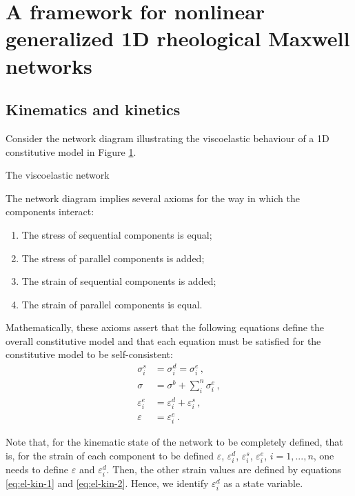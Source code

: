 \documentclass[12pt]{article}
\begin{document}
\section{A framework for nonlinear generalized 1D rheological Maxwell networks}

\subsection{Kinematics and kinetics}
Consider the network diagram illustrating the viscoelastic behaviour of a 1D constitutive model in Figure \ref{fig:network-diagram}.
\begin{figure}[!htb]
	\centering
	\caption{ }
	\label{fig:network-diagram}
\end{figure}
The viscoelastic network 

The network diagram implies several axioms for the way in which the components interact:
\begin{enumerate}
	\item The stress of sequential components is equal;
	\item The stress of parallel components is added;
	\item The strain of sequential components is added;
	\item The strain of parallel components is equal.
\end{enumerate} 

Mathematically, these axioms assert that the following equations define the overall constitutive model and that each equation must be satisfied for the constitutive model to be self-consistent:
\begin{align}
	\sigma^{s}_{i} &= \sigma^{d}_{i} = \sigma^{e}_{i}\,,\\
	\sigma & = \sigma^{b} + \sum_{i}^{n}\sigma^{e}_{i}\,,\\
	\varepsilon^{e}_{i} &= \varepsilon^{d}_{i} + \varepsilon^{s}_{i}\,,\label{eq:el-kin-1}\\
	\varepsilon& = \varepsilon^{e}_{i}\,.\label{eq:el-kin-2}
\end{align}

Note that, for the kinematic state of the network to be completely defined, that is, for the strain of each component to be defined $\varepsilon$, $\varepsilon^{d}_{i}$, $\varepsilon^{s}_{i}$, $\varepsilon^{e}_{i}$, $i=1,...,n$, one needs to define $\varepsilon$ and $\varepsilon^{d}_{i}$. Then, the other strain values are defined by equations \eqref{eq:el-kin-1} and \eqref{eq:el-kin-2}. Hence, we identify $\varepsilon^{d}_{i}$ as a state variable. 
\end{document}
